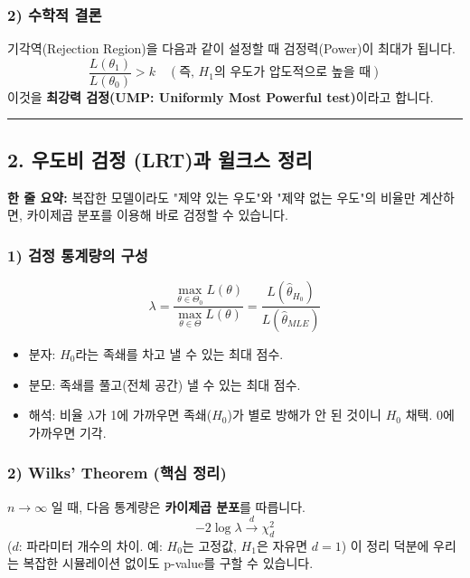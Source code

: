\documentclass[11pt,a4paper]{book}
\theoremstyle{definition}
\begin{document}
\subsubsection*{2) 수학적 결론}
기각역(Rejection Region)을 다음과 같이 설정할 때 검정력(Power)이 최대가 됩니다.
$$ \frac{L(\theta_1)}{L(\theta_0)} > k \quad (\text{즉, } H_1\text{의 우도가 압도적으로 높을 때}) $$
이것을 \textbf{최강력 검정(UMP: Uniformly Most Powerful test)}이라고 합니다.

\vspace{0.5cm}\hrule\vspace{0.5cm}

\subsection{2. 우도비 검정 (LRT)과 윌크스 정리}

\begin{conceptbox}[title={개념 2: 만능열쇠 (Universal Key)}]
\textbf{한 줄 요약:} 복잡한 모델이라도 "제약 있는 우도"와 "제약 없는 우도"의 비율만 계산하면, 카이제곱 분포를 이용해 바로 검정할 수 있습니다.
\end{conceptbox}

\subsubsection*{1) 검정 통계량의 구성}
$$ \lambda = \frac{\max_{\theta \in \Theta_0} L(\theta)}{\max_{\theta \in \Theta} L(\theta)} = \frac{L(\hat{\theta}_{H_0})}{L(\hat{\theta}_{MLE})} $$
\begin{itemize}
    \item 분자: $H_0$라는 족쇄를 차고 낼 수 있는 최대 점수.
    \item 분모: 족쇄를 풀고(전체 공간) 낼 수 있는 최대 점수.
    \item 해석: 비율 $\lambda$가 1에 가까우면 족쇄($H_0$)가 별로 방해가 안 된 것이니 $H_0$ 채택. 0에 가까우면 기각.
\end{itemize}

\subsubsection*{2) Wilks' Theorem (핵심 정리)}
$n \to \infty$ 일 때, 다음 통계량은 \textbf{카이제곱 분포}를 따릅니다.
$$ -2 \log \lambda \xrightarrow{d} \chi^2_d $$
($d$: 파라미터 개수의 차이. 예: $H_0$는 고정값, $H_1$은 자유면 $d=1$)
이 정리 덕분에 우리는 복잡한 시뮬레이션 없이도 p-value를 구할 수 있습니다.
\end{document}
